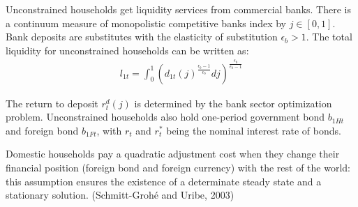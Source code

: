 \documentclass[12pt]{article}
\begin{document}
Unconstrained households get liquidity services from commercial banks. There is a continuum measure of monopolistic competitive banks index by $j \in [0,1]$. Bank deposits are substitutes with the elasticity of substitution $\epsilon_b > 1$. The total liquidity for unconstrained households can be written as: 
\begin{align}
\label{l1t}
l_{1t} = \int_0^1({d_{1t}(j)}^{\frac{\epsilon_b-1}{\epsilon_b}}dj)^{\frac{\epsilon_b}{\epsilon_b-1}} 
\end{align}

The return to deposit $r_t^d(j)$ is determined by the bank sector optimization problem. Unconstrained households also hold one-period government bond $b_{1Ht}$ and foreign bond $b_{1Ft}$, with $r_t$ and $r_t^*$ being the nominal interest rate of bonds. 

Domestic households pay a quadratic adjustment cost when they change their financial position (foreign bond and foreign currency) with the rest of the world: this assumption ensures the existence of a determinate steady state and a stationary solution. (Schmitt-Groh{\'e} and Uribe, 2003)
\end{document}
